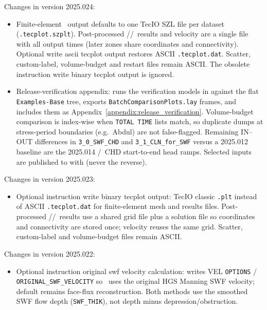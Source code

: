 \label{changes:2025.024}
Changes in version 2025.024:
\begin{itemize}
\item Finite-element \tecplot\ output defaults to one TecIO SZL file per dataset (\texttt{.tecplot.szplt}). Post-processed \gwf/\swf/\cln\ results and velocity are a single file with all output times (later zones share coordinates and connectivity). Optional {\sf write ascii tecplot output} restores ASCII \texttt{.tecplot.dat}. Scatter, custom-label, volume-budget and restart files remain ASCII. The obsolete instruction {\sf write binary tecplot output} is ignored.
\item Release-verification appendix:  runs the verification models in  against the flat \texttt{Examples-Base} tree, exports \texttt{BatchComparisonPlots.lay} frames, and includes them as Appendix~\ref{appendix:release_verification}. Volume-budget comparison is index-wise when \texttt{TOTAL TIME} lists match, so duplicate dumps at stress-period boundaries (e.g.\ Abdul) are not false-flagged. Remaining IN--OUT differences in \texttt{3\_0\_SWF\_CHD} and \texttt{3\_1\_CLN\_for\_SWF} versus a 2025.012 baseline are the 2025.014 \cln/\swf\ CHD start-to-end head ramps. Selected inputs are published to  with  (never the reverse).
\end{itemize}

\label{changes:2025.023}
Changes in version 2025.023:
\begin{itemize}
\item Optional instruction {\sf write binary tecplot output}: TecIO classic \texttt{.plt} instead of ASCII \texttt{.tecplot.dat} for finite-element mesh and results files. Post-processed \gwf/\swf/\cln\ results use a shared grid file plus a solution file so coordinates and connectivity are stored once; velocity reuses the same grid. Scatter, custom-label and volume-budget files remain ASCII.
\end{itemize}

\label{changes:2025.022}
Changes in version 2025.022:
\begin{itemize}
\item Optional instruction {\sf original swf velocity calculation}: writes VEL \texttt{OPTIONS} / \texttt{ORIGINAL\_SWF\_VELOCITY} so \mfus\ uses the original HGS Manning SWF velocity; default remains face-flux reconstruction. Both methods use the smoothed SWF flow depth (\texttt{SWF\_THIK}), not depth minus depression/obstruction.
\end{itemize}


